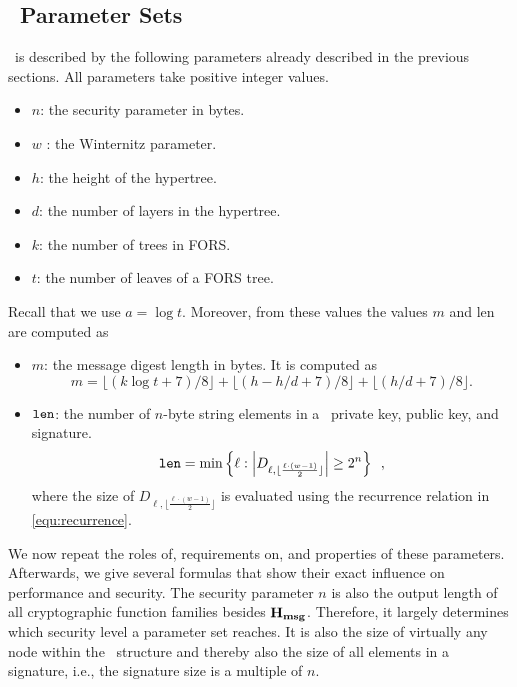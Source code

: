 \subsection{\SPHINCSA\ Parameter Sets}

\SPHINCSA\ is described by the following parameters already described in the previous sections. All parameters take positive integer values.

\begin{itemize}

\item $n$: the security parameter in bytes.

\item $w$ : the Winternitz parameter.

\item $h$: the height of the hypertree.

\item $d$: the number of layers in the hypertree.

\item $k$: the number of trees in FORS.

\item $t$: the number of leaves of a FORS tree. 

\end{itemize}


Recall that we use $a=\log t$. Moreover, from these values the values $m$ and len are computed as
\begin{itemize}
    \item $ m $: the message digest length in bytes. It is computed as $$m=\lfloor(k\log t+7)/8\rfloor+\lfloor(h-h/d+7)/8\rfloor+\lfloor(h/d+7)/8\rfloor.$$
    \item $\mathtt{len}$: the number of $n$-byte string elements in a \WOTSCS\ private key, public key, and signature.
    $$
    \mathtt{len} = \min \left\{ \ell : \left| D_{\ell, \lfloor \frac{\ell \cdot (w-1)}{2} \rfloor} \right| \geq 2^n \right\} \enspace,
    $$
    where the size of $D_{\ell, \lfloor \frac{\ell \cdot (w-1)}{2} \rfloor}$ is evaluated using the recurrence relation in \cref{equ:recurrence}.
\end{itemize}

We now repeat the roles of, requirements on, and properties of these parameters. Afterwards, we give several formulas that show their exact influence on performance and security. The security parameter $n$ is also the output length of all cryptographic function families besides $\mathbf{H_{msg}}$. Therefore, it largely determines which security level a parameter set reaches. It is also the size of virtually any node within the \SPHINCSA\ structure and thereby also the size of all elements in a signature, i.e., the signature size is a multiple of $n$.

